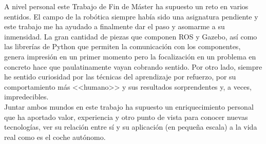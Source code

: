 A nivel personal este Trabajo de Fin de Máster ha supuesto un reto en varios sentidos. El campo de la robótica siempre había sido una asignatura pendiente y este trabajo me ha ayudado a finalmente dar el paso y asomarme a su inmensidad. La gran cantidad de piezas que componen ROS y Gazebo, así como las librerías de Python que permiten la comunicación con los componentes, genera impresión en un primer momento pero la focalización en un problema en concreto hace que paulatinamente vayan cobrando sentido. Por otro lado, siempre he sentido curiosidad por las técnicas del aprendizaje por refuerzo, por su comportamiento más <<humano>> y sus resultados sorprendentes y, a veces, impredecibles.\\

Juntar ambos mundos en este trabajo ha supuesto un enriquecimiento personal que ha aportado valor, experiencia y otro punto de vista para conocer nuevas tecnologías, ver su relación entre sí y su aplicación (en pequeña escala) a la vida real como es el coche autónomo.